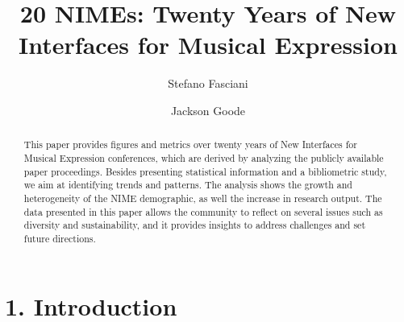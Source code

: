 \documentclass[sigconf]{nimeart}
\begin{document}
\title[20 NIMEs: Twenty Years of New Interfaces for Musical Expression]{20 NIMEs: Twenty Years of New Interfaces for Musical Expression}
\author{Stefano Fasciani}
\author{Jackson Goode}
\renewcommand{\shortauthors}{Fasciani and Goode}
\begin{abstract}
This paper provides figures and metrics over twenty years of New Interfaces for Musical Expression conferences, which are derived by analyzing the publicly available paper proceedings. Besides presenting statistical information and a bibliometric study, we aim at identifying trends and patterns. The analysis shows the growth and heterogeneity of the NIME demographic, as well the increase in research output. The data presented in this paper allows the community to reflect on several issues such as diversity and sustainability, and it provides insights to address challenges and set future directions.
\end{abstract}

\maketitle
\section{1. Introduction}\label{introduction}
\end{document}
